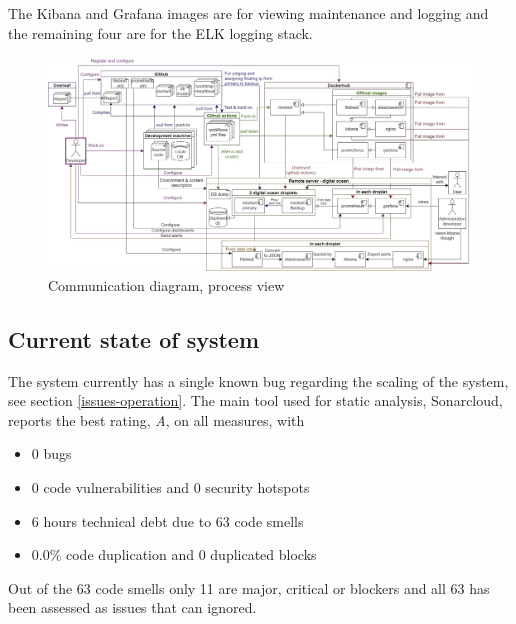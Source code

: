 The Kibana and Grafana images are for viewing maintenance and logging and the remaining four are for the ELK logging stack.

\begin{figure}[H]
    \centering
    \hspace*{-1.5in}
    \includegraphics[width=1.6\textwidth]{images/Diagrams-Process_view_communication_diagram.jpg}
    \caption{Communication diagram, process view}
    \label{fig:communicationDiagram}
\end{figure}

\subsection{Current state of system}
The system currently has a single known bug regarding the scaling of the system, see section \ref{issues-operation}. The main tool used for static analysis, Sonarcloud, reports the best rating, \textit{A}, on all measures, with 

\begin{itemize}
    \item 0 bugs
    \item 0 code vulnerabilities and 0 security hotspots
    \item 6 hours technical debt due to 63 code smells
    \item 0.0\% code duplication and 0 duplicated blocks
\end{itemize}

Out of the 63 code smells only 11 are major, critical or blockers and all 63 has been assessed as issues that can ignored.